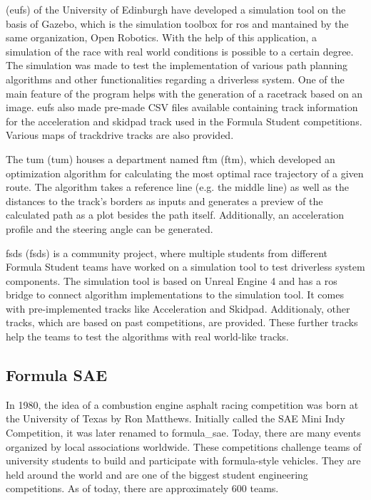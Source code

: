  (\acrshort{eufs}) of the University of Edinburgh have developed a simulation tool on the basis of Gazebo, which is the simulation toolbox for \acrshort{ros} and mantained by the same organization, Open Robotics. With the help of this application, a simulation of the race with real world conditions is possible to a certain degree. The simulation was made to test the implementation of various path planning algorithms and other functionalities regarding a driverless system. One of the main feature of the program helps with the generation of a racetrack based on an image. \acrshort{eufs} also made pre-made CSV files available containing track information for the acceleration and skidpad track used in the Formula Student competitions. Various maps of trackdrive tracks are also provided.
\cite{eufs_sim_gitlab}

The \acrlong{tum} (\acrshort{tum}) houses a department named \acrlong{ftm} (\acrshort{ftm}), which developed an optimization algorithm for calculating the most optimal race trajectory of a given route. The algorithm takes a reference line (e.g. the middle line) as well as the distances to the track's borders as inputs and generates a preview of the calculated path as a plot besides the path itself. Additionally, an acceleration profile and the steering angle can be generated.
\cite{tumftm_optimization_algoritm}

\acrshort{fsds} (\acrlong{fsds}) is a community project, where multiple students from different Formula Student teams have worked on a simulation tool to test driverless system components. The simulation tool is based on Unreal Engine 4 \cite{unreal_engine} and has a \acrshort{ros} bridge to connect algorithm implementations to the simulation tool. It comes with pre-implemented tracks like Acceleration and Skidpad. Additionaly, other tracks, which are based on past competitions, are provided. These further tracks help the teams to test the algorithms with real world-like tracks.
\cite{fsds_github}

\subsection{Formula SAE}
In 1980, the idea of a combustion engine asphalt racing competition was born at the University of Texas by Ron Matthews. Initially called the SAE Mini Indy Competition, it was later renamed to \Gls{formula_sae}. Today, there are many events organized by local associations worldwide.
\cite{formula_sae}
These competitions challenge teams of university students to build and participate with formula-style vehicles. They are held around the world and are one of the biggest student engineering competitions. As of today, there are approximately 600 teams. \cite{sae_student_events}

